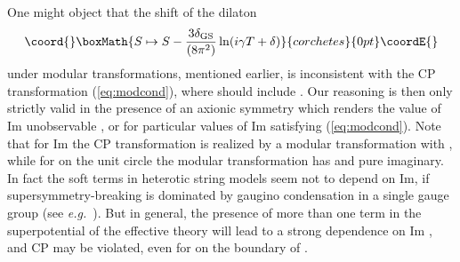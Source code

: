 \documentclass[a4paper,12pt]{article}
\begin{document}
One might object that the shift of the dilaton
\[\coord{}\boxMath{ S\mapsto S-\frac{3\delta_{\rm GS}}{(8\pi^2)} \ln (i\gamma T+\delta) }{corchetes}{0pt}\coordE{}\]
under modular transformations, mentioned earlier, is inconsistent with the CP transformation (\ref{eq:modcond}), where \coordHE{} should include \coordHE{}. Our reasoning is then only strictly valid in the presence of an axionic symmetry which renders the value of Im\coordHE{} unobservable \cite{IbanezLust,Choi97,GeorgiKN}, or for particular values of Im\coordHE{} satisfying (\ref{eq:modcond}). Note that for Im\coordHE{} the CP transformation \coordHE{} is realized by a modular transformation with \coordHE{}, while for \coordHE{} on the unit circle the modular transformation \coordHE{} has \coordHE{} and \coordHE{} pure imaginary. In fact the soft terms in heterotic string models seem not to depend on Im\coordHE{}, if supersymmetry-breaking is dominated by gaugino condensation in a single gauge group (see {\em e.g.\/}\ \cite{Bailin:1998iz+97}). But in general, the presence of more than one term in the superpotential of the effective theory will lead to a strong dependence on Im\coordHE{} \cite{Choi97}, and CP may be violated, even for \coordHE{} on the boundary of \coordHE{}.
\end{document}
